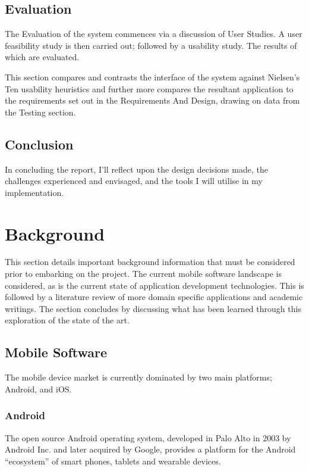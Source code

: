 \documentclass[a4paper]{article}
\begin{document}
\subsection{Evaluation}
The Evaluation of the system commences via a discussion of User Studies. A user feasibility study is then carried out; followed by a usability study. The results of which are evaluated.

This section compares and contrasts the interface of the system against Nielsen's Ten usability heuristics and further more compares the resultant application to the requirements set out in the Requirements And Design, drawing on data from the Testing section.
\subsection{Conclusion}
In concluding the report, I'll reflect upon the design decisions made, the challenges experienced
and envisaged, and the tools I will utilise in my implementation.




























\newpage
\section{Background}
This section details important background information that must be considered prior to embarking on the project. The current mobile software landscape is considered, as is the current state of application development technologies. This is followed by a literature review of more domain specific applications and academic writings. The section concludes by discussing what has been learned through this exploration of the state of the art.
\subsection{Mobile Software}
The mobile device market is currently dominated by two main platforms; Android, and iOS. 
\subsubsection{Android}
The open source Android operating system, developed in Palo Alto in 2003 by Android Inc. and later acquired by Google, provides a platform for the Android ``ecosystem'' of smart phones, tablets and wearable devices.\cite{Andro8} %
\end{document}
